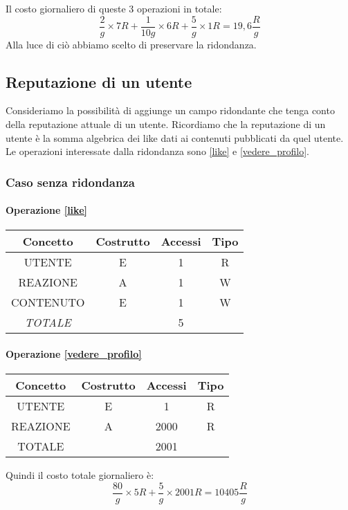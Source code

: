 \documentclass[a4paper,12pt]{report}
\begin{document}
Il costo giornaliero di queste 3 operazioni in totale:
\begin{equation}
  \frac{2} g \times 7 R + \frac{1} {10g} \times 6 R + \frac{5} g \times 1 R = 19,6 \frac{R} g 
\end{equation}
Alla luce di ciò abbiamo scelto di preservare la ridondanza.
\subsection{Reputazione di un utente}
Consideriamo la possibilità di aggiunge un campo ridondante che tenga conto della reputazione attuale di un utente. Ricordiamo che la reputazione di un utente è la somma algebrica dei like dati ai contenuti pubblicati da quel utente.
Le operazioni interessate dalla ridondanza sono \ref{like} e \ref{vedere_profilo}.
\subsubsection{Caso senza ridondanza}
\begin{table}[h]
  \paragraph{Operazione \ref{like}\newline}
\begin{tabular}{|c|c|c|c|}
\hline
Concetto        & Costrutto & Accessi & Tipo \\ \hline
UTENTE          & E         & 1       & R    \\ \hline
REAZIONE        & A         & 1       & W    \\ \hline
CONTENUTO       & E         & 1       & W    \\ \hline
\textit{TOTALE} &           & 5       &      \\ \hline
\end{tabular}
\end{table}

\begin{table}[H]
  \paragraph{Operazione \ref{vedere_profilo}\newline}
\begin{tabular}{|c|c|c|c|}
\hline
Concetto & Costrutto & Accessi & Tipo \\ \hline
UTENTE   & E         & 1       & R    \\ \hline
REAZIONE & A         & 2000    & R    \\ \hline
TOTALE   &           & 2001    &      \\ \hline
\end{tabular}
\end{table}
Quindi il costo totale giornaliero è:
\begin{equation}
  \frac{80} g \times 5 R + \frac{5} {g} \times 2001 R = 10405 \frac{R} g 
\end{equation}
\end{document}
